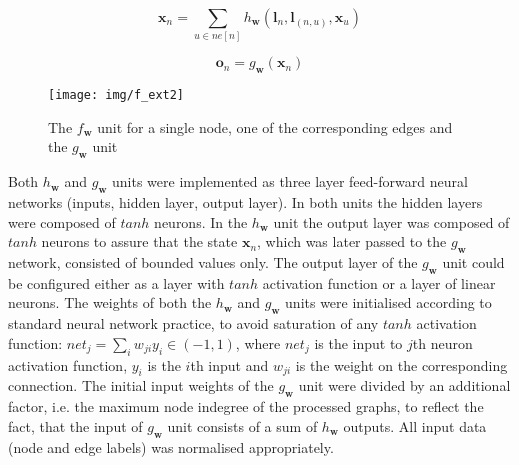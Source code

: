 \documentclass[]{spie}  %
\newcommand{\bm}[1]{\boldsymbol{#1}}
\begin{document}
\begin{equation}
\bm{x}_n = \sum_{u \in ne[n]} h_{\bm{w}}(\bm{l}_n, \bm{l}_{(n, u)}, \bm{x}_u)
\label{eq:hw}
\end{equation}

\begin{equation}
\bm{o}_n = g_{\bm{w}}(\bm{x}_n)
\label{eq:gw}
\end{equation}

\begin{figure}[h!]
\begin{center}
	\texttt{[image: img/f\_ext2]}
	\caption{The $f_{\bm{w}}$ unit for a single node, one of the corresponding edges and the $g_{\bm{w}}$ unit}
	\label{fig:gnn_f}
\end{center}
\end{figure}

Both $h_{\bm{w}}$ and $g_{\bm{w}}$ units were implemented as three layer feed-forward neural networks (inputs, hidden layer, output layer). In both units the hidden layers were composed of $tanh$ neurons. In the $h_{\bm{w}}$ unit the output layer was composed of $tanh$ neurons to assure that the state $\bm{x}_n$, which was later passed to the $g_{\bm{w}}$ network, consisted of bounded values only. The output layer of the $g_{\bm{w}}$ unit could be configured either as a layer with $tanh$ activation function or a layer of linear neurons. The weights of both the $h_{\bm{w}}$ and $g_{\bm{w}}$ units were initialised according to standard neural network practice, to avoid saturation of any $tanh$ activation function: $net_j = \sum_i w_{ji} y_i \in (-1, 1)$, where $net_j$ is the input to $j$th neuron activation function, $y_i$ is the $i$th input and $w_{ji}$ is the weight on the corresponding connection. The initial input weights of the $g_{\bm{w}}$ unit were divided by an additional factor, i.e. the maximum node indegree of the processed graphs, to reflect the fact, that the input of $g_{\bm{w}}$ unit consists of a sum of $h_{\bm{w}}$ outputs. All input data (node and edge labels) was normalised appropriately.
\end{document}
